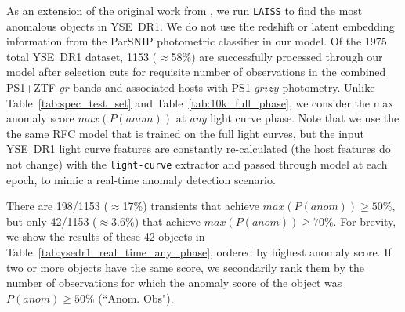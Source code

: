\documentclass[twocolumn]{aastex63}
\newcommand{\laiss}{\texttt{LAISS}}
\begin{document}
As an extension of the original work from \cite{Aleo2023}, we run \laiss{} to find the most anomalous objects in YSE~DR1. We do not use the redshift or latent embedding information from the ParSNIP photometric classifier in our model. Of the 1975 total YSE~DR1 dataset, 1153 ($\approx$58\%) are successfully processed through our model after selection cuts for requisite number of observations in the combined PS1+ZTF-$gr$ bands and associated hosts with PS1-$grizy$ photometry. Unlike Table~\ref{tab:spec_test_set} and Table~\ref{tab:10k_full_phase}, we consider the max anomaly score $max(P(anom))$ at \emph{any} light curve phase. Note that we use the the same RFC model that is trained on the full light curves, but the input YSE~DR1 light curve features are constantly re-calculated (the host features do not change) with the \texttt{light-curve} extractor and passed through model at each epoch, to mimic a real-time anomaly detection scenario. \par

There are 198/1153 ($\approx$17\%) transients that achieve $max(P(anom))\geq50\%$, but only 42/1153 ($\approx$3.6\%) that achieve $max(P(anom))\geq70\%$. For brevity, we show the results of these 42 objects in Table~\ref{tab:ysedr1_real_time_any_phase}, ordered by highest anomaly score. If two or more objects have the same score, we secondarily rank them by the number of observations for which the anomaly score of the object was $P(anom)\geq50\%$ (``Anom. Obs"). \par
\end{document}
